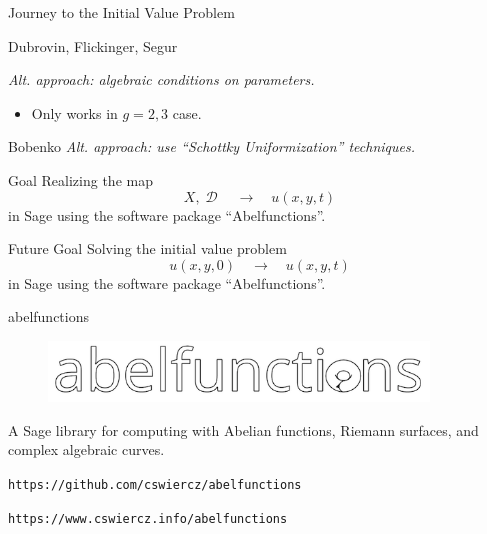 \documentclass{beamer}
\DeclareMathOperator{\DivD}{\mathcal{D}}
\begin{document}
\begin{frame}[fragile]{Journey to the Initial Value Problem}{}
\begin{overprint}
    
    \begin{block}{Dubrovin, Flickinger, Segur}
      {\it Alt. approach: algebraic conditions on parameters.
      \begin{itemize}
      \item Only works in $g=2,3$ case.
      \end{itemize}
      }
    \end{block}

    
    \begin{block}{Bobenko}
      {\it Alt. approach: use ``Schottky Uniformization'' techniques.}
    \end{block}


    \begin{block}{Goal}
      Realizing the map
      \[
      X,\DivD \quad \longrightarrow \quad u(x,y,t)
      \]
      in Sage using the software package ``Abelfunctions''.
    \end{block}
    

    \begin{block}{Future Goal}
      Solving the initial value problem
      \[
      u(x,y,0) \quad \longrightarrow \quad u(x,y,t)
      \]
      in Sage using the software package ``Abelfunctions''.
  \end{block}
    
  \end{overprint}
\end{frame}

\begin{frame}{abelfunctions}{}
  \begin{block}{}
  \begin{figure}[t]
    \centering
    \includegraphics[width=0.9\textwidth]{./images/abelfunctions.png}
  \end{figure}
  \end{block}

  \vspace{16pt}

  A Sage library for computing with Abelian functions, Riemann surfaces, and
  complex algebraic curves.
  \begin{center}
    {\tt https://github.com/cswiercz/abelfunctions}

    {\tt https://www.cswiercz.info/abelfunctions}
  \end{center}
\end{frame}
\end{document}
